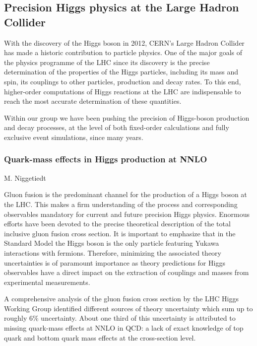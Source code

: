 \documentclass{FBR_Bericht_2025}
\begin{document}
\subsection{Precision Higgs physics at the Large Hadron Collider}
\begin{refsection}
With the discovery of the Higgs boson in 2012, CERN's Large Hadron Collider has made a 
historic contribution to particle physics. One of the major goals of the physics programme
of the LHC since its discovery is the precise determination of the properties of the Higgs
particles, including its mass and spin, its couplings to other particles, production and decay
rates. To this end, higher-order computations of Higgs reactions at the LHC are indispensable
to reach the most accurate determination of these quantities.

Within our group we have been pushing the precision of Higgs-boson production and decay
processes, at the level of both fixed-order calculations and fully exclusive event simulations,
since many years. 


\subsubsection{Quark-mass effects in Higgs production at NNLO}
\begin{Namen}
M. Niggetiedt
\end{Namen}
%

Gluon fusion is the predominant channel for the production of a Higgs boson at the LHC. This makes a firm understanding of the process and corresponding observables mandatory for current and future precision Higgs physics. Enormous efforts have been devoted to the precise theoretical description of the total inclusive gluon fusion cross section. It is important to emphasize that in the Standard Model the Higgs boson is the only particle featuring Yukawa interactions with fermions. Therefore, minimizing the associated theory uncertainties is of paramount importance as theory predictions for Higgs observables have a direct impact on the extraction of couplings and masses from experimental measurements.

A comprehensive analysis of the gluon fusion cross section by the LHC Higgs Working Group identified different sources of theory uncertainty which sum up to roughly $6\%$ uncertainty. About one third of this uncertainty is attributed to missing quark-mass effects at NNLO in QCD: a lack of exact knowledge of top quark and bottom quark mass effects at the cross-section level.


\end{refsection}
\end{document}
